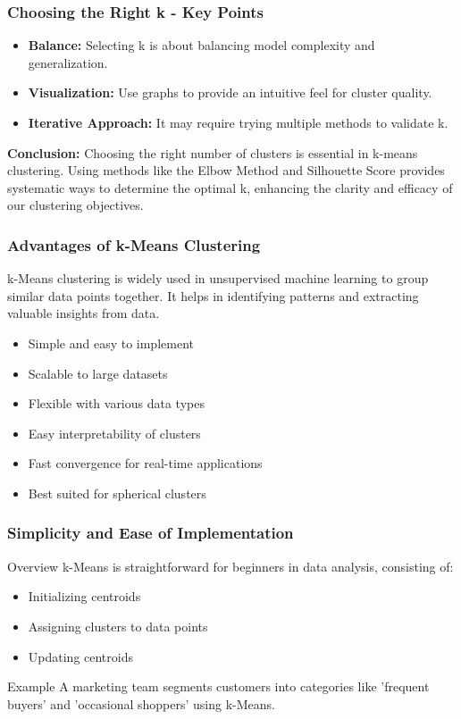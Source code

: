 \documentclass[aspectratio=169]{beamer}
\begin{document}
\begin{frame}[fragile]
    \frametitle{Choosing the Right k - Key Points}
    \begin{itemize}
        \item \textbf{Balance:} Selecting k is about balancing model complexity and generalization.
        \item \textbf{Visualization:} Use graphs to provide an intuitive feel for cluster quality.
        \item \textbf{Iterative Approach:} It may require trying multiple methods to validate k.
    \end{itemize}

    \textbf{Conclusion:}
    Choosing the right number of clusters is essential in k-means clustering. Using methods like the Elbow Method and Silhouette Score provides systematic ways to determine the optimal k, enhancing the clarity and efficacy of our clustering objectives.
\end{frame}

\begin{frame}[fragile]
    \frametitle{Advantages of k-Means Clustering}
    
    k-Means clustering is widely used in unsupervised machine learning to group similar data points together. It helps in identifying patterns and extracting valuable insights from data.
    
    \begin{itemize}
        \item Simple and easy to implement
        \item Scalable to large datasets
        \item Flexible with various data types
        \item Easy interpretability of clusters
        \item Fast convergence for real-time applications
        \item Best suited for spherical clusters
    \end{itemize}
\end{frame}

\begin{frame}[fragile]
    \frametitle{Simplicity and Ease of Implementation}
    
    \begin{block}{Overview}
        k-Means is straightforward for beginners in data analysis, consisting of:
        \begin{itemize}
            \item Initializing centroids
            \item Assigning clusters to data points
            \item Updating centroids
        \end{itemize}
    \end{block}
    
    \begin{exampleblock}{Example}
        A marketing team segments customers into categories like 'frequent buyers' and 'occasional shoppers' using k-Means.
    \end{exampleblock}
\end{frame}
\end{document}
